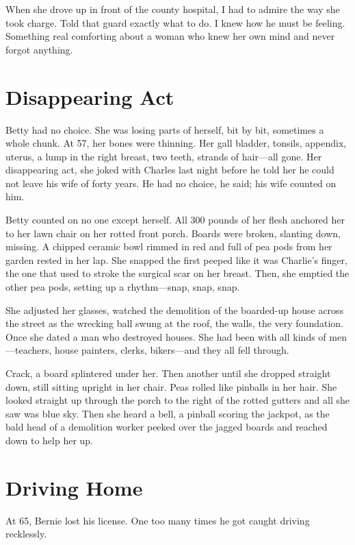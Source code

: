\documentclass[twoside,10pt]{book}
\begin{document}
When she drove up in front of the county hospital, I had to admire the
way she took charge. Told that guard exactly what to do. I knew how he
must be feeling. Something real comforting about a woman who knew her
own mind and never forgot anything.



\cleardoublepage
\chapter{Disappearing Act}

Betty had no choice. She was losing parts of herself, bit by bit,
sometimes a whole chunk. At 57, her bones were thinning. Her gall
bladder, tonsils, appendix, uterus, a lump in the right breast, two
teeth, strands of hair---all gone. Her disappearing act, she joked with
Charles last night before he told her he could not leave his wife of
forty years. He had no choice, he said; his wife counted on him.

Betty counted on no one except herself. All 300 pounds of her flesh
anchored her to her lawn chair on her rotted front porch. Boards were
broken, slanting down, missing. A chipped ceramic bowl rimmed in red and
full of pea pods from her garden rested in her lap. She snapped the first
peeped like it was Charlie's finger, the one that used to stroke the
surgical scar on her breast. Then, she emptied the other pea pods,
setting up a rhythm---snap, snap, snap.

She adjusted her glasses, watched the demolition of the boarded-up house
across the street as the wrecking ball swung at the roof, the walls, the
very foundation. Once she dated a man who destroyed houses. She had been
with all kinds of men---teachers, house painters, clerks, bikers---and
they all fell through.

Crack, a board splintered under her. Then another until she dropped
straight down, still sitting upright in her chair. Peas rolled like
pinballs in her hair. She looked straight up through the porch to the
right of the rotted gutters and all she saw was blue sky.
\clearpage
Then she heard
a bell, a pinball scoring the jackpot, as the bald head of a demolition
worker peeked over the jagged boards and reached down to help her
up.


\cleardoublepage
\chapter{Driving Home}

At 65, Bernie lost his license. One too many times he got caught driving
recklessly.
\end{document}

